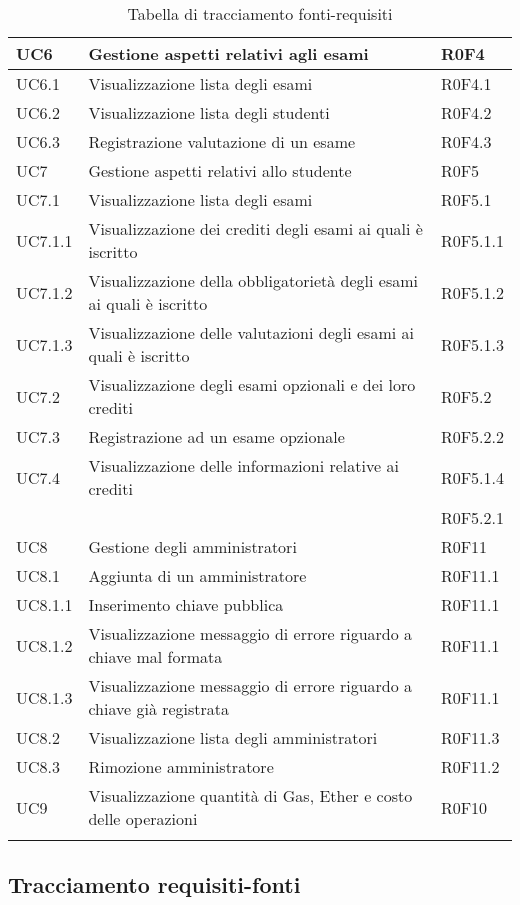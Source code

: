 \documentclass[AnalisiDeiRequisiti.tex]{subfiles}
\begin{document}
\begin{longtable}[H]{|p{2cm}|p{5cm}|p{5cm}|}
	UC6 & Gestione aspetti relativi agli esami & R0F4 \\ \hline
	UC6.1 & Visualizzazione lista degli esami & R0F4.1 \\ \hline
	UC6.2 & Visualizzazione lista degli studenti & R0F4.2  \\ \hline
	UC6.3 & Registrazione valutazione di un esame & R0F4.3 \\ \hline
	UC7 & Gestione aspetti relativi allo studente & R0F5 \\ \hline
	UC7.1 & Visualizzazione lista degli esami & R0F5.1 \\ \hline
	UC7.1.1 & Visualizzazione dei crediti degli esami ai quali è iscritto & R0F5.1.1 \\ \hline
	UC7.1.2 & Visualizzazione della obbligatorietà degli esami ai quali è iscritto & R0F5.1.2 \\ \hline
	UC7.1.3 & Visualizzazione delle valutazioni degli esami ai quali è iscritto	& R0F5.1.3 \\ \hline
	UC7.2 & Visualizzazione degli esami opzionali e dei loro crediti & R0F5.2 \\ \hline
	UC7.3 & Registrazione ad un esame opzionale & R0F5.2.2 \\ \hline
	UC7.4 & Visualizzazione delle informazioni relative ai crediti & R0F5.1.4 \\ \hline
	& & R0F5.2.1 \\ \hline
	UC8 & Gestione degli amministratori & R0F11 \\ \hline
	UC8.1 & Aggiunta di un amministratore & R0F11.1 \\ \hline
	UC8.1.1 & Inserimento chiave pubblica & R0F11.1 \\ \hline
	UC8.1.2 & Visualizzazione messaggio di errore riguardo a chiave mal formata & R0F11.1 \\ \hline
	UC8.1.3 & Visualizzazione messaggio di errore riguardo a chiave già registrata & R0F11.1 \\ \hline
	UC8.2 & Visualizzazione lista degli amministratori & R0F11.3 \\ \hline
	UC8.3 & Rimozione amministratore & R0F11.2 \\ \hline
	UC9 & Visualizzazione quantità di Gas, Ether e costo delle operazioni & R0F10 \\ \hline

	\caption{Tabella di tracciamento fonti-requisiti}
\end{longtable}

\subsection{Tracciamento requisiti-fonti}
\end{document}
